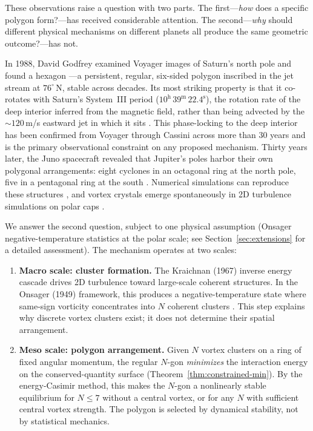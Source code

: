 \documentclass[12pt, a4paper]{article}
\numberwithin{equation}{section}
\begin{document}
These observations raise a question with two parts.  The first---\emph{how}
does a specific polygon form?---has received considerable attention.
The second---\emph{why} should different physical mechanisms on different
planets all produce the same geometric outcome?---has not.

In 1988, David Godfrey examined Voyager images of Saturn's north pole
and found a hexagon \citep{Godfrey1988}---a persistent, regular,
six-sided polygon inscribed in the jet stream at $76^\circ$\,N, stable
across decades.  Its most striking property is that it
co-rotates with Saturn's System~III period ($10^{\mathrm{h}}\,39^{\mathrm{m}}\,22.4^{\mathrm{s}}$),
the rotation rate of the deep interior inferred from the
magnetic field, rather than being advected by the $\sim\!120$\,m/s
eastward jet in which it sits \citep{Godfrey1988, SanchezLavega2014}.
This phase-locking to the deep interior has been confirmed from Voyager
through Cassini across more than 30 years and is the primary
observational constraint on any proposed mechanism.  Thirty years later, the Juno spacecraft revealed that
Jupiter's poles harbor their own polygonal arrangements: eight cyclones
in an octagonal ring at the north pole, five in a pentagonal ring at the
south \citep{Adriani2018}.  Numerical simulations can reproduce these
structures \citep{Morales2011, Gavriel2021}, and vortex crystals emerge
spontaneously in 2D turbulence simulations on polar caps
\citep{Siegelman2022}.

We answer the second question, subject to one physical assumption
(Onsager negative-temperature statistics at the polar scale; see
Section~\ref{sec:extensions} for a detailed assessment).  The
mechanism operates at two scales:
\begin{enumerate}
  \item \textbf{Macro scale: cluster formation.}  The Kraichnan (1967)
    inverse energy cascade drives 2D turbulence toward large-scale coherent
    structures.  In the Onsager (1949) framework, this produces a
    negative-temperature state where same-sign vorticity concentrates
    into $N$ coherent clusters \citep{BouchetVenaille2012, Siegelman2022}.
    This step explains why discrete vortex clusters exist; it does not
    determine their spatial arrangement.

  \item \textbf{Meso scale: polygon arrangement.}  Given $N$ vortex
    clusters on a ring of fixed angular momentum, the regular $N$-gon
    \emph{minimizes} the interaction energy on the conserved-quantity
    surface (Theorem~\ref{thm:constrained-min}).  By the energy-Casimir
    method, this makes the $N$-gon a nonlinearly stable equilibrium for
    $N \le 7$ without a central vortex, or for any $N$ with sufficient
    central vortex strength.  The polygon is selected by dynamical
    stability, not by statistical mechanics.
\end{enumerate}
\end{document}
